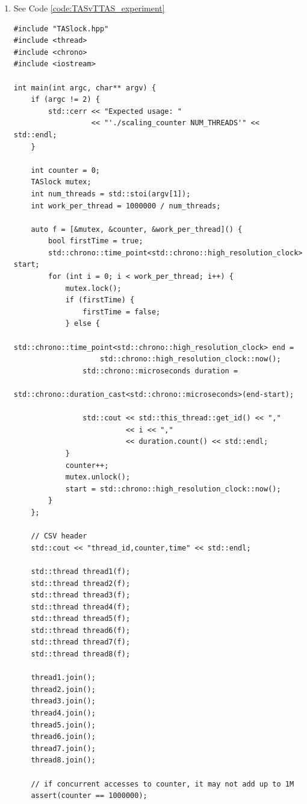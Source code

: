 \begin{solution}
    \begin{enumerate}
        \item See Code \ref{code:TASvTTAS_experiment}
\makebox[\linewidth]{\rule{17cm}{0.4pt}}
{\centering \label{code:TASvTTAS_experiment}
\begin{verbatim}
#include "TASlock.hpp"
#include <thread>
#include <chrono>
#include <iostream>

int main(int argc, char** argv) {
    if (argc != 2) {
        std::cerr << "Expected usage: "
                  << "'./scaling_counter NUM_THREADS'" << std::endl;
    }

    int counter = 0;
    TASlock mutex;
    int num_threads = std::stoi(argv[1]);
    int work_per_thread = 1000000 / num_threads;

    auto f = [&mutex, &counter, &work_per_thread]() {
        bool firstTime = true;
        std::chrono::time_point<std::chrono::high_resolution_clock> start;
        for (int i = 0; i < work_per_thread; i++) {
            mutex.lock();
            if (firstTime) {
                firstTime = false;
            } else {
                std::chrono::time_point<std::chrono::high_resolution_clock> end =
                    std::chrono::high_resolution_clock::now();
                std::chrono::microseconds duration =
                    std::chrono::duration_cast<std::chrono::microseconds>(end-start);
                    
                std::cout << std::this_thread::get_id() << ","
                          << i << ","
                          << duration.count() << std::endl;
            }
            counter++;
            mutex.unlock();
            start = std::chrono::high_resolution_clock::now();
        }
    };

    // CSV header
    std::cout << "thread_id,counter,time" << std::endl;

    std::thread thread1(f);
    std::thread thread2(f);
    std::thread thread3(f);
    std::thread thread4(f);
    std::thread thread5(f);
    std::thread thread6(f);
    std::thread thread7(f);
    std::thread thread8(f);

    thread1.join();
    thread2.join();
    thread3.join();
    thread4.join();
    thread5.join();
    thread6.join();
    thread7.join();
    thread8.join();

    // if concurrent accesses to counter, it may not add up to 1M
    assert(counter == 1000000);


\end{verbatim}}
\end{enumerate}
\end{solution}
